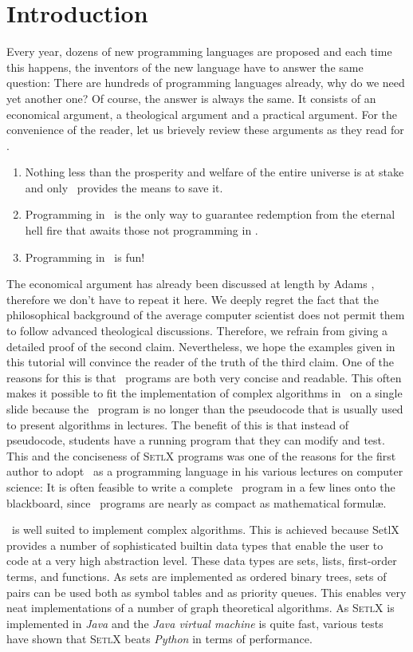 \chapter{Introduction}
Every year, dozens of new programming languages are proposed and each time this
happens,  the inventors of the new language have to answer the same question: 
There are hundreds of programming languages already, why do we need yet another one?  
Of course, the answer is always the same.  It consists of an economical argument, a
theological argument and a practical argument. For the
convenience of the reader, let us brievely review these arguments as they read for \setlx.  
\begin{enumerate}
\item Nothing less than the prosperity and welfare of the entire universe is at
      stake and only \setlx\ provides the means to save it.
\item Programming in \setlx\ is the only way to guarantee redemption from 
      the eternal hell fire that awaits those not programming in \setlx.
\item Programming in \setlx\ is fun!
\end{enumerate}
The economical argument has already been discussed at length by Adams \cite{adams:1980},
therefore we don't have to repeat it here.   We deeply
regret the fact that the philosophical background of the average computer scientist does not permit
them to follow advanced theological discussions.  Therefore, we refrain from giving a
detailed proof of the second claim.  Nevertheless, we hope the examples given in this
tutorial will convince the reader of the truth of the third claim.
  One of the reasons for this is that \setlx\ programs are both very concise and
readable.  This often makes it possible to fit the implementation of complex algorithms in \setlx\ on a
single slide because the \setlx\ program is no longer than the pseudocode that is usually used to
present algorithms in lectures.  The benefit of this is that instead of pseudocode, students have a
running program that they can modify and test. This and the
conciseness of \textsc{SetlX} programs was one of the reasons for
the first author to adopt \setlx\ as a programming language in his various lectures on computer
science: It is often feasible to write a complete \setlx\ program in a few lines 
onto the blackboard, since \setlx\ programs are nearly as compact as mathematical formul\ae.


\setlx\ is well suited to implement complex algorithms. This is achieved because SetlX
provides a number of sophisticated builtin data types that enable the user to code at a very high
abstraction level.
These data types are sets, lists, first-order terms, and functions.  
As sets are implemented as ordered binary trees, sets of pairs can be used both as symbol
tables and as priority queues.  This enables very neat implementations 
of a number of graph theoretical algorithms.  As \textsc{SetlX} is implemented in \textsl{Java} and
the \emph{Java virtual machine} is quite fast, various tests have shown that \textsc{SetlX} beats
\textsl{Python} in terms of performance. 


